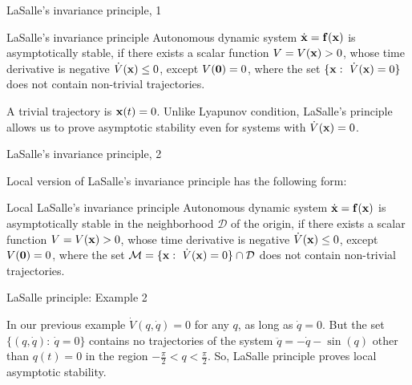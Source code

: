 \documentclass{beamer}
\begin{document}
\begin{frame}{LaSalle's invariance principle, 1}
	\begin{flushleft}
		
		\begin{block}{LaSalle's invariance principle}
			Autonomous dynamic system $\dot{\mathbf{x}} = \mathbf{f}(\mathbf{x})$ is asymptotically stable, if there exists a scalar function $V = V(\mathbf{x}) > 0$, whose time derivative is negative $\dot V(\mathbf{x}) \leq 0$, except $V(\mathbf{0}) = 0$, where the set $\{\mathbf{x}: \   \dot V(\mathbf{x}) = 0  \}$ does not contain non-trivial trajectories.
		\end{block}
	
		\bigskip
		
		A trivial trajectory is $\mathbf{x}(t) = 0$. Unlike Lyapunov condition, LaSalle's principle allows us to prove asymptotic stability even for systems with $\dot V(\mathbf{x}) = 0$.
		
		
	\end{flushleft}
\end{frame}




\begin{frame}{LaSalle's invariance principle, 2}
	\begin{flushleft}
		
		Local version of LaSalle's invariance principle has the following form:
		
		\begin{block}{Local LaSalle's invariance principle}
			Autonomous dynamic system $\dot{\mathbf{x}} = \mathbf{f}(\mathbf{x})$ is asymptotically stable in the neighborhood $\mathcal D$ of the origin, if there exists a scalar function $V = V(\mathbf{x}) > 0$, whose time derivative is negative $\dot V(\mathbf{x}) \leq 0$, except $V(\mathbf{0}) = 0$, where the set $\mathcal M = \{\mathbf{x}: \   \dot V(\mathbf{x}) = 0  \} \cap \mathcal D$ does not contain non-trivial trajectories.
		\end{block}
		
		
	\end{flushleft}
\end{frame}



\begin{frame}{LaSalle principle: Example 2}
	\begin{flushleft}
		
			In our previous example $\dot V(q, \dot{q}) = 0$ for any $q$, as long as $\dot{q} = 0$. But the set $\{(q, \dot{q}): \   \dot{q} = 0 \}$ contains no trajectories of the system $\ddot{q}  = -\dot{q} - \sin(q)$ other than $q(t) = 0$ in the region $-\frac{\pi}{2} < q < \frac{\pi}{2}$. So, LaSalle principle proves local asymptotic stability.
		
	\end{flushleft}
\end{frame}
\end{document}
